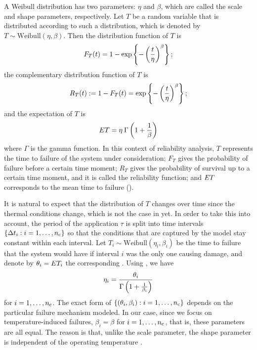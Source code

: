 A Weibull distribution has two parameters: $\eta$ and $\beta$, which are called
the scale and shape parameters, respectively. Let $T$ be a random variable
that is distributed according to such a distribution, which is denoted by $T
\sim \mathrm{Weibull}(\eta, \beta)$. Then the distribution function
\cite{durrett2010} of $T$ is
\begin{equation} \elab{weibull-distribution}
  F_T(t) = 1 - \exp\left\{-\left(\frac{t}{\eta}\right)^\beta\right\};
\end{equation}
the complementary distribution function of $T$ is
\begin{equation} \elab{weibull-survival}
  R_T(t) := 1 - F_T(t) = \exp\left\{-\left(\frac{t}{\eta}\right)^\beta\right\};
\end{equation}
and the expectation of $T$ is
\begin{equation} \elab{weibull-expectation}
  \expectation{T} = \eta \: \Gamma\left(1 + \frac{1}{\beta}\right)
\end{equation}
where $\Gamma$ is the gamma function. In this context of reliability analysis,
$T$ represents the time to failure of the system under consideration; $F_T$
gives the probability of failure before a certain time moment; $R_T$ gives the
probability of survival up to a certain time moment, and it is called the
reliability function; and $E T$ corresponds to the mean time to
failure ().

It is natural to expect that the distribution of $T$ changes over time since the
thermal conditions change, which is not the case in 
yet. In order to take this into account, the period of the application $\tau$ is
split into \nc time intervals $\{ \Delta t_i: i = 1, \dots, {n_\mathrm{c}} \}$ so that the
conditions that are captured by the model stay constant within each interval.
Let $T_i \sim \mathrm{Weibull}(\eta_i, \beta_i)$ be the time to failure that the
system would have if interval $i$ was the only one causing damage, and denote by
$\theta_i = E T_i$ the corresponding . Using
, we have
\begin{equation} \elab{weibull-eta-one}
  \eta_i = \frac{\theta_i}{\Gamma\left(1 + \frac{1}{\beta_i}\right)}
\end{equation}
for $i = 1, \dots, {n_\mathrm{c}}$. The exact form of $\{ (\theta_i, \beta_i): i =
1, \dots, {n_\mathrm{c}} \}$ depends on the particular failure mechanism modeled. In our
case, since we focus on temperature-induced failures, $\beta_i = \beta$ for $i =
1, \dots, {n_\mathrm{c}}$, that is, these parameters are all equal. The reason is that,
unlike the scale parameter, the shape parameter is independent of the operating
temperature \cite{chang2006}.


